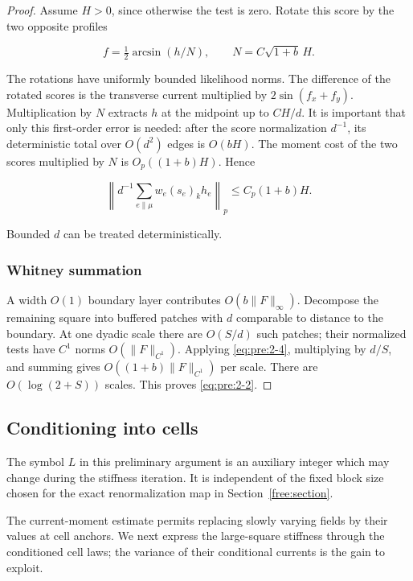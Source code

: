 \begin{proof}
Assume \(H>0\), since otherwise the test is zero. Rotate this score by the two opposite profiles

\[
 f=\tfrac12\arcsin(h/N),\qquad N=C\sqrt{1+b}\,H.
\]

The rotations have uniformly bounded likelihood norms. The difference of the rotated scores is the transverse current multiplied by \(2\sin(f_x+f_y)\). Multiplication by \(N\) extracts \(h\) at the midpoint up to \(CH/d\). It is important that only this first-order error is needed: after the score normalization \(d^{-1}\), its deterministic total over \(O(d^2)\) edges is \(O(bH)\). The moment cost of the two scores multiplied by \(N\) is \(O_p((1+b)H)\). Hence

\begin{equation}
\left\|d^{-1}\sum_{e\parallel\mu}w_e(s_e)_k h_e\right\|_p
\leq C_p(1+b)H.
\label{eq:pre:2-4}
\end{equation}

Bounded \(d\) can be treated deterministically.

\subsubsection{Whitney summation}\label{pre:part-2-3}

A width \(O(1)\) boundary layer contributes \(O(b\|F\|_\infty)\). Decompose the remaining square into buffered patches with \(d\) comparable to distance to the boundary. At one dyadic scale there are \(O(S/d)\) such patches; their normalized tests have \(C^1\) norms \(O(\|F\|_{C^1})\). Applying \eqref{eq:pre:2-4}, multiplying by \(d/S\), and summing gives \(O((1+b)\|F\|_{C^1})\) per scale. There are \(O(\log(2+S))\) scales. This proves \eqref{eq:pre:2-2}.
\end{proof}


\subsection{Conditioning into cells}\label{pre:cells}

The symbol \(L\) in this preliminary argument is an auxiliary integer
which may change during the stiffness iteration. It is independent of
the fixed block size chosen for the exact renormalization map in
Section~\ref{free:section}.

The current-moment estimate permits replacing slowly varying fields by
their values at cell anchors. We next express the large-square stiffness
through the conditioned cell laws; the variance of their conditional
currents is the gain to exploit.

